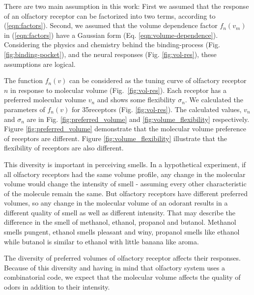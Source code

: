 \documentclass[11pt]{paper} %
\newcommand{\numberofreceptors}{35}
\begin{document}
There are two main assumption in this work: 
First we assumed that the response of an olfactory receptor can be factorized into two terms, 
according to (\ref{eqn:factors}).
Second, we assumed that the volume dependence factor $f_n(v_m)$ in (\ref{eqn:factors}) 
have a Gaussian form (Eq. \ref{eqn:volume-dependence}).
Considering the physics and chemistry behind the binding-process (Fig. \ref{fig:binding-pocket}), 
and the neural responses (Fig. \ref{fig:vol-res}), 
these assumptions are logical. 


The function $f_n(v)$ can be considered as the tuning curve of olfactory receptor $n$ in response to molecular volume (Fig.~\ref{fig:vol-res}). 
Each receptor has a preferred molecular volume $v_n$ and shows some flexibility $\sigma_n$. 
We calculated the parameters of $f_n(v)$ for \numberofreceptors receptors (Fig. \ref{fig:vol-res}). 
The calculated values, $v_n$ and $\sigma_n$ are in Fig. \ref{fig:preferred_volume} and \ref{fig:volume_flexibility} respectively.
Figure \ref{fig:preferred_volume} demonstrate that the molecular volume preference of receptors are different. 
Figure \ref{fig:volume_flexibility} illustrate that the flexibility of receptors are also different.

This diversity is important in perceiving smells. 
In a hypothetical experiment, 
if all olfactory receptors had the same volume profile, 
any change in the molecular volume would change the intensity of smell - assuming every other characteristic of the molecule remain the same.
But olfactory receptors have different preferred volumes, 
so any change in the molecular volume of an odorant results in a different quality of smell as well as different intensity.
That may describe the difference in the smell of methanol, ethanol, propanol and butanol. 
Methanol smells pungent, ethanol smells pleasant and winy, propanol smells like ethanol while butanol is similar to ethanol with little banana like aroma.

The diversity of preferred volumes of olfactory receptor affects their responses.
Because of this diversity and having in mind that olfactory system uses a combinatorial code, 
we expect that the  molecular volume affects the quality of odors in addition to their intensity. 
\end{document}
